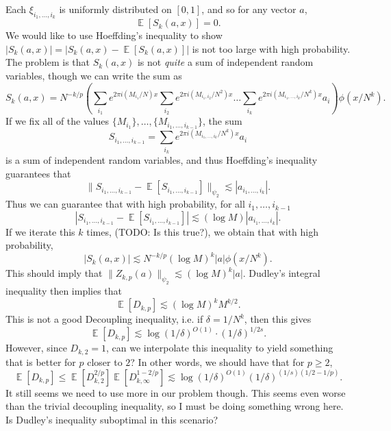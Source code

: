 \documentclass[dvipsnames,letterpaper,12pt]{article}
\numberwithin{equation}{section}
\numberwithin{theorem}{section}
\DeclareMathOperator{\EE}{\mathbb{E}}
\begin{document}
Each $\xi_{i_1,\dots,i_k}$ is uniformly distributed on $[0,1]$, and so for any vector $a$,
%
\[ \EE[S_k(a,x)] = 0. \]
%
We would like to use Hoeffding's inequality to show $|S_k(a,x)| = |S_k(a,x) - \EE[S_k(a,x)]|$ is not too large with high probability. The problem is that $S_k(a,x)$ is not \emph{quite} a sum of independent random variables, though we can write the sum as
%
\[ S_k(a,x) = N^{-k/p} \left( \sum_{i_1} e^{2 \pi i (M_{i_1} / N) x} \sum_{i_2} e^{2 \pi i (M_{i_1,i_2} / N^2) x} \dots \sum_{i_k} e^{2 \pi i (M_{i_1,\dots,i_k} / N^k) x} a_i \right) \phi(x/N^k). \]
%
If we fix all of the values $\{ M_{i_1} \}, \dots, \{ M_{i_1,\dots,i_{k-1}} \}$, the sum
%
\[ S_{i_1,\dots,i_{k-1}} = \sum_{i_k} e^{2 \pi i (M_{i_1,\dots,i_k} / N^k) x} a_i \]
%
is a sum of independent random variables, and thus Hoeffding's inequality guarantees that
%
\[ \| S_{i_1,\dots,i_{k-1}} - \EE[S_{i_1,\dots,i_{k-1}}] \|_{\psi_2} \lesssim |a_{i_1,\dots,i_k}|. \]
%
Thus we can guarantee that with high probability, for all $i_1,\dots,i_{k-1}$
%
\[ |S_{i_1,\dots,i_{k-1}} - \EE[S_{i_1,\dots,i_{k-1}}]| \lesssim (\log M) |a_{i_1,\dots,i_k}|. \]
%
If we iterate this $k$ times, (TODO: Is this true?), we obtain that with high probability,
%
\[ |S_k(a,x)| \lesssim N^{-k/p} (\log M)^k |a| \phi(x/N^k). \]
%
This should imply that $\| Z_{k,p}(a) \|_{\psi_2} \lesssim (\log M)^k |a|$. Dudley's integral inequality then implies that
%
\[ \EE[D_{k,p}] \lesssim (\log M)^k M^{k/2}. \]
%
This is not a good Decoupling inequality, i.e. if $\delta = 1/N^k$, then this gives
%
\[ \EE[D_{k,p}] \lesssim \log(1/\delta)^{O(1)} \cdot (1/\delta)^{1/2s}. \]
%
However, since $D_{k,2} = 1$, can we interpolate this inequality to yield something that is better for $p$ closer to $2$? In other words, we should have that for $p \geq 2$,
%
\[ \EE[D_{k,p}] \leq \EE[D_{k,2}^{2/p}] \EE[D_{k,\infty}^{1-2/p}] \lesssim \log(1/\delta)^{O(1)} (1/\delta)^{(1/s)(1/2 - 1/p)}. \]
%
It still seems we need to use more in our problem though. This seems even worse than the trivial decoupling inequality, so I must be doing something wrong here. Is Dudley's inequality suboptimal in this scenario?
\end{document}
